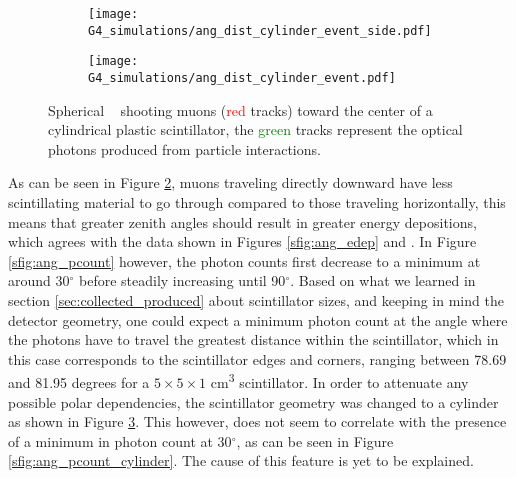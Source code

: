 \begin{figure}[H]
  \centering
  \begin{subfigure}[t]{0.48\textwidth}
    \texttt{[image: G4\_simulations/ang\_dist\_cylinder\_event\_side.pdf]}
    \caption{\label{sfig:ang_dist_cyl}}
  \end{subfigure}
  \hfill
  \begin{subfigure}[t]{0.48\textwidth}
    \texttt{[image: G4\_simulations/ang\_dist\_cylinder\_event.pdf]}
    \caption{\label{sfig:ang_dist_cyl_side}}
  \end{subfigure}
  \caption{\label{fig:ang_dist_cyl_event}Spherical \gps~ shooting muons (\textcolor{red}{red} tracks) toward the center of a cylindrical plastic scintillator, the \textcolor{green}{green} tracks represent the optical photons produced from particle interactions.}
\end{figure}

As can be seen in Figure \ref{sfig:ang_dist_cyl_side}, muons traveling directly downward have less scintillating material to go through compared to those traveling horizontally, this means that greater zenith angles should result in greater energy depositions, which agrees with the data shown in Figures \ref{sfig:ang_edep} and . In Figure \ref{sfig:ang_pcount} however, the photon counts first decrease to a minimum at around 30$^\circ$ before steadily increasing until 90$^\circ$. Based on what we learned in section \ref{sec:collected_produced} about scintillator sizes, and keeping in mind the detector geometry, one could expect a minimum photon count at the angle where the photons have to travel the greatest distance within the scintillator, which in this case corresponds to the scintillator edges and corners, ranging between 78.69 and 81.95 degrees for a $5\times5\times1$ \unit{\cm\cubed} scintillator. In order to attenuate any possible polar dependencies, the scintillator geometry was changed to a cylinder as shown in Figure \ref{fig:ang_dist_cyl_event}. This however, does not seem to correlate with the presence of a minimum in photon count at 30$^\circ$, as can be seen in Figure \ref{sfig:ang_pcount_cylinder}. The cause of this feature is yet to be explained.

